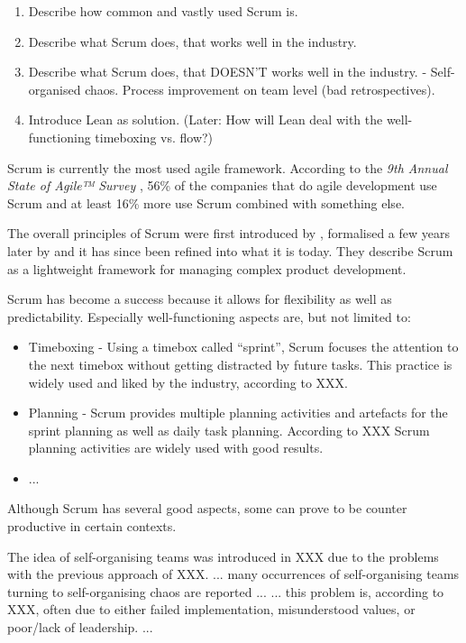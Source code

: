 \begin{enumerate}
	\item Describe how common and vastly used Scrum is.
	\item Describe what Scrum does, that works well in the industry.
	\item Describe what Scrum does, that DOESN'T works well in the industry. - Self-organised chaos. Process improvement on team level (bad retrospectives).
	\item Introduce Lean as solution. (Later: How will Lean deal with the well-functioning timeboxing vs. flow?)
\end{enumerate}

Scrum is currently the most used agile framework. According to the \textit{9th Annual State of Agile™ Survey} \citep{VersionOne}, 56\% of the companies that do agile development use Scrum and at least 16\% more use Scrum combined with something else.

The overall principles of Scrum were first introduced by \citet{Takeuchi1986}, formalised a few years later by \citet{Schwaber} and it has since been refined into what it is today.
They describe Scrum as a lightweight framework for managing complex product development. 

Scrum has become a success because it allows for flexibility as well as predictability.
Especially well-functioning aspects are, but not limited to:
\begin{itemize}
	\item Timeboxing - Using a timebox called “sprint”, Scrum focuses the attention to the next timebox without getting distracted by future tasks. This practice is widely used and liked by the industry, according to XXX.
	\item Planning - Scrum provides multiple planning activities and artefacts for the sprint planning as well as daily task planning. According to XXX Scrum planning activities are widely used with good results.
	\item ...
\end{itemize}

Although Scrum has several good aspects, some can prove to be counter productive in certain contexts.
 
The idea of self-organising teams was introduced in XXX due to the problems with the previous approach of XXX.
... many occurrences of self-organising teams turning to self-organising chaos are reported ...
... this problem is, according to XXX, often due to either failed implementation, misunderstood values, or poor/lack of leadership. ...

